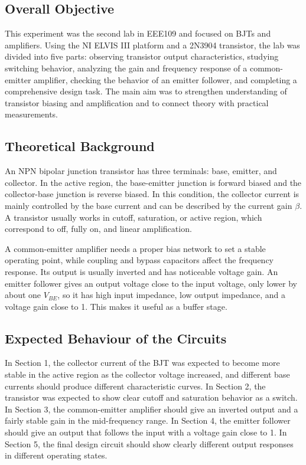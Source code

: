 \documentclass{ctexart}
\begin{document}
\subsection{Overall Objective}
This experiment was the second lab in EEE109 and focused on BJTs and amplifiers. Using the NI ELVIS III platform and a 2N3904 transistor, the lab was divided into five parts: observing transistor output characteristics, studying switching behavior, analyzing the gain and frequency response of a common-emitter amplifier, checking the behavior of an emitter follower, and completing a comprehensive design task. The main aim was to strengthen understanding of transistor biasing and amplification and to connect theory with practical measurements.

\subsection{Theoretical Background}
An NPN bipolar junction transistor has three terminals: base, emitter, and collector. In the active region, the base-emitter junction is forward biased and the collector-base junction is reverse biased. In this condition, the collector current is mainly controlled by the base current and can be described by the current gain $\beta$. A transistor usually works in cutoff, saturation, or active region, which correspond to off, fully on, and linear amplification.

A common-emitter amplifier needs a proper bias network to set a stable operating point, while coupling and bypass capacitors affect the frequency response. Its output is usually inverted and has noticeable voltage gain. An emitter follower gives an output voltage close to the input voltage, only lower by about one $V_{BE}$, so it has high input impedance, low output impedance, and a voltage gain close to 1. This makes it useful as a buffer stage.

\subsection{Expected Behaviour of the Circuits}
In Section 1, the collector current of the BJT was expected to become more stable in the active region as the collector voltage increased, and different base currents should produce different characteristic curves. In Section 2, the transistor was expected to show clear cutoff and saturation behavior as a switch. In Section 3, the common-emitter amplifier should give an inverted output and a fairly stable gain in the mid-frequency range. In Section 4, the emitter follower should give an output that follows the input with a voltage gain close to 1. In Section 5, the final design circuit should show clearly different output responses in different operating states.
\end{document}
